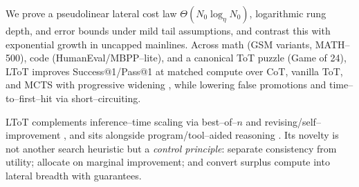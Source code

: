 \documentclass{article}
\begin{document}
\noindent We prove a pseudolinear lateral cost law $\Theta(N_0\log_{\eta} N_0)$, logarithmic rung depth, and error bounds under mild tail assumptions, and contrast this with exponential growth in uncapped mainlines. Across math (GSM variants, MATH--500), code (HumanEval/MBPP--lite), and a canonical ToT puzzle (Game of 24), LToT improves Success@1/Pass@1 at matched compute over CoT, vanilla ToT, and MCTS with progressive widening \citep{xie2024mcts}, while lowering false promotions and time--to--first--hit via short--circuiting.

LToT complements inference--time scaling via best--of--$n$ \citep{chen2024bot,yang2024bot} and revising/self--improvement \citep{madaan2023selfrefine}, and sits alongside program/tool--aided reasoning \citep{gao2022pal,chen2022pot}.
Its novelty is not another search heuristic but a \emph{control principle}: separate consistency from utility; allocate on marginal improvement; and convert surplus compute into lateral breadth with guarantees.
\end{document}
